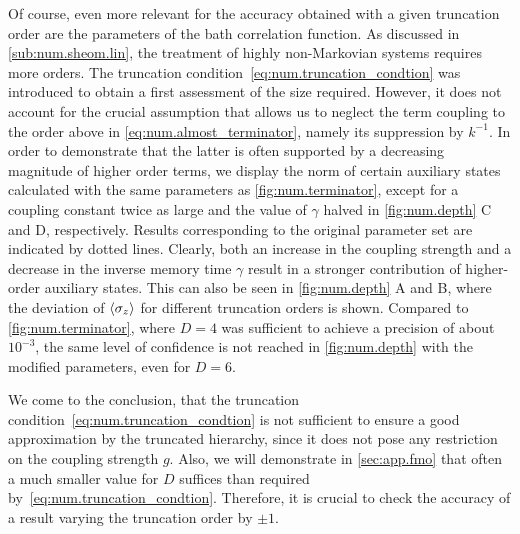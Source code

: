 Of course, even more relevant for the accuracy obtained with a given truncation order are the parameters of the bath correlation function.
As discussed in \autoref{sub:num.sheom.lin}, the treatment of highly non-Markovian systems requires more orders.
The truncation condition~\ref{eq:num.truncation_condtion} was introduced to obtain a first assessment of the size required.
However, it does not account for the crucial assumption that allows us to neglect the term coupling to the order above in \autoref{eq:num.almost_terminator}, namely its suppression by $k^{-1}$.
In order to demonstrate that the latter is often supported by a decreasing magnitude of higher order terms, we display the norm of certain auxiliary states calculated with the same parameters as \autoref{fig:num.terminator}, except for a coupling constant twice as large and the value of $\gamma$ halved in \autoref{fig:num.depth} C and D, respectively.
Results corresponding to the original parameter set are indicated by dotted lines.
Clearly, both an increase in the coupling strength and a decrease in the inverse memory time $\gamma$ result in a stronger contribution of higher-order auxiliary states.
This can also be seen in \autoref{fig:num.depth} A and B, where the deviation of $\langle \sigma_z \rangle$ for different truncation orders is shown.
Compared to \autoref{fig:num.terminator}, where $D=4$ was sufficient to achieve a precision of about $10^{-3}$, the same level of confidence is not reached in \autoref{fig:num.depth} with the modified parameters, even for $D=6$.

We come to the conclusion, that the truncation condition~\ref{eq:num.truncation_condtion} is not sufficient to ensure a good approximation by the truncated hierarchy, since it does not pose any restriction on the coupling strength $g$.
Also, we will demonstrate in \autoref{sec:app.fmo} that often a much smaller value for $D$ suffices than required by~\ref{eq:num.truncation_condtion}.
Therefore, it is crucial to check the accuracy of a result varying the truncation order by $\pm 1$.
